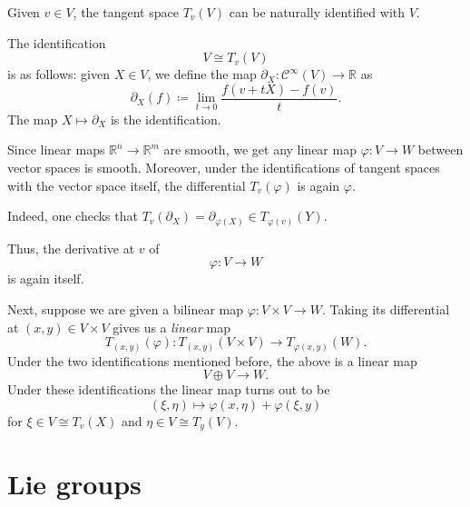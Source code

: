 \documentclass[12pt]{article}
\begin{document}
Given $v \in V$, the tangent space $T_{v}(V)$ can be naturally identified with $V$.

\begin{rem}
	The identification 
	\begin{equation*} 
		V \cong T_{v}(V)
	\end{equation*}
	is as follows: given $X \in V$, we define the map $\partial_{X} \colon \mathcal{C}^{\infty}(V) \to \mathbb{R}$ as
	\begin{equation*} 
		\partial_{X}(f) \coloneqq \lim_{t \to 0} \frac{f(v + tX) - f(v)}{t}.
	\end{equation*}
	The map $X \mapsto \partial_{X}$ is the identification.
\end{rem}

Since linear maps $\mathbb{R}^{n} \to \mathbb{R}^{m}$ are smooth, we get any linear map $\varphi \colon V \to W$ between vector spaces is smooth. 
Moreover, under the identifications of tangent spaces with the vector space itself, the differential $T_{v}(\varphi)$ is again $\varphi$. 

Indeed, one checks that $T_{v}(\partial_{X}) = \partial_{\varphi(X)} \in T_{\varphi(v)}(Y)$.

Thus, the derivative at $v$ of
\begin{equation*} 
	\varphi \colon V \to W
\end{equation*}
is again itself.

Next, suppose we are given a bilinear map $\varphi \colon V \times V \to W$. 
Taking its differential at $(x, y) \in V \times V$ gives us a \emph{linear} map
\begin{equation*} 
	T_{(x, y)}(\varphi) : T_{(x, y)}(V \times V) \to T_{\varphi(x, y)}(W).
\end{equation*}
Under the two identifications mentioned before, the above is a linear map
\begin{equation*} 
	V \oplus V \to W.
\end{equation*}
Under these identifications the linear map turns out to be
\begin{equation} \label{eq:product-rule-bilinear-map}
	(\xi, \eta) \mapsto \varphi(x, \eta) + \varphi(\xi, y)
\end{equation}
for $\xi \in V \cong T_{v}(X)$ and $\eta \in V \cong T_{y}(V)$.

\section{Lie groups}
\end{document}
